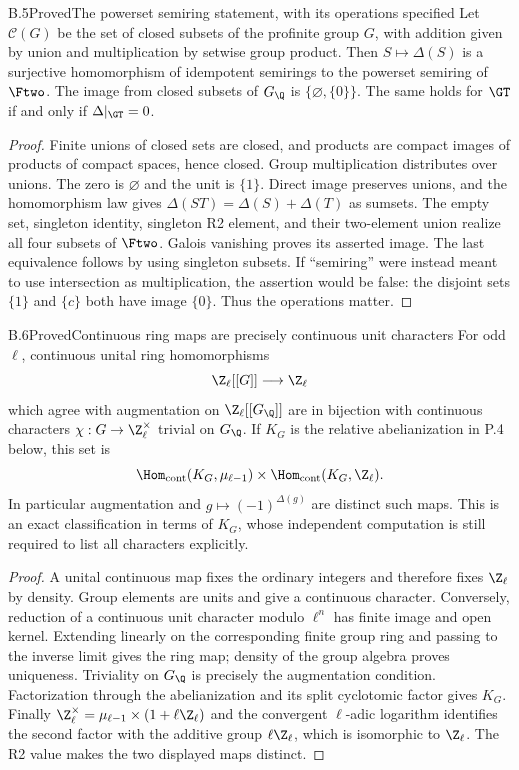 \begin{statement}{B.5}{Proved}{The powerset semiring statement, with its operations specified}
Let $\mathscr C(G)$ be the set of closed subsets of the
profinite group $G$, with addition given by union and
multiplication by setwise group product. Then
$S\mapsto\Delta(S)$ is a surjective homomorphism of
idempotent semirings to the powerset semiring of $\Ftwo$.
The image from closed subsets of $G_{\Q}$ is
$\{\varnothing,\{0\}\}$. The same holds for $\GT$
if and only if $\Delta|_{\GT}=0$.
\end{statement}
\begin{proof}
Finite unions of closed sets are closed, and products
are compact images of products of compact spaces, hence
closed. Group multiplication distributes over unions.
The zero is $\varnothing$ and the unit is $\{1\}$.
Direct image preserves unions, and the homomorphism law
gives $\Delta(ST)=\Delta(S)+\Delta(T)$ as sumsets.
The empty set, singleton identity, singleton R2 element,
and their two-element union realize all four subsets of
$\Ftwo$. Galois vanishing proves its asserted image.
The last equivalence follows by using singleton subsets.
If ``semiring'' were instead meant to use intersection
as multiplication, the assertion would be false: the
disjoint sets $\{1\}$ and $\{c\}$ both have image
$\{0\}$. Thus the operations matter.
\end{proof}

\begin{statement}{B.6}{Proved}{Continuous ring maps are precisely continuous unit characters}
For odd $\ell$, continuous unital ring homomorphisms
\[
 \Z_\ell[[G]]\longrightarrow\Z_\ell
\]
which agree with augmentation on $\Z_\ell[[G_{\Q}]]$
are in bijection with continuous characters
$\chi:G\to\Z_\ell^\times$ trivial on $G_{\Q}$.
If $K_G$ is the relative abelianization in P.4 below,
this set is
\[
 \Hom_{\rm cont}(K_G,\mu_{\ell-1})
 \times\Hom_{\rm cont}(K_G,\Z_\ell).
\]
In particular augmentation and $g\mapsto(-1)^{\Delta(g)}$
are distinct such maps. This is an exact classification
in terms of $K_G$, whose independent computation is
still required to list all characters explicitly.
\end{statement}
\begin{proof}
A unital continuous map fixes the ordinary integers
and therefore fixes $\Z_\ell$ by density. Group
elements are units and give a continuous character.
Conversely, reduction of a continuous unit character
modulo $\ell^n$ has finite image and open kernel.
Extending linearly on the corresponding finite group
ring and passing to the inverse limit gives the ring
map; density of the group algebra proves uniqueness.
Triviality on $G_{\Q}$ is precisely the augmentation
condition. Factorization through the abelianization
and its split cyclotomic factor gives $K_G$.
Finally
$\Z_\ell^\times=\mu_{\ell-1}\times(1+\ell\Z_\ell)$
and the convergent $\ell$-adic logarithm identifies
the second factor with the additive group $\ell\Z_\ell$,
which is isomorphic to $\Z_\ell$. The R2 value makes
the two displayed maps distinct.
\end{proof}

